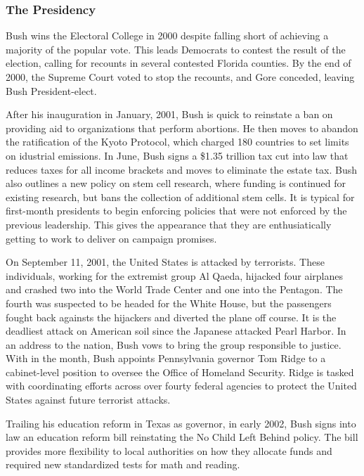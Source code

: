 \documentclass{article}
\begin{document}
        \subsubsection{The Presidency}
        Bush wins the Electoral College in 2000 despite falling short of achieving a majority of the popular vote. This leads Democrats to contest the result of the election, calling for recounts in several contested Florida counties. By the end of 2000, the Supreme Court voted to stop the recounts, and Gore conceded, leaving Bush President-elect.
        \par
        After his inauguration in January, 2001, Bush is quick to reinstate a ban on providing aid to organizations that perform abortions. He then moves to abandon the ratification of the Kyoto Protocol, which charged 180 countries to set limits on idustrial emissions. In June, Bush signs a \$1.35 trillion tax cut into law that reduces taxes for all income brackets and moves to eliminate the estate tax. Bush also outlines a new policy on stem cell research, where funding is continued for existing research, but bans the collection of additional stem cells.\cite{bushevents} It is typical for first-month presidents to begin enforcing policies that were not enforced by the previous leadership. This gives the appearance that they are enthusiatically getting to work to deliver on campaign promises.
        \par
        On September 11, 2001, the United States is attacked by terrorists. These individuals, working for the extremist group Al Qaeda, hijacked four airplanes and crashed two into the World Trade Center and one into the Pentagon. The fourth was suspected to be headed for the White House, but the passengers fought back againsts the hijackers and diverted the plane off course. It is the deadliest attack on American soil since the Japanese attacked Pearl Harbor. In an address to the nation, Bush vows to bring the group responsible to justice. With in the month, Bush appoints Pennsylvania governor Tom Ridge to a cabinet-level position to oversee the Office of Homeland Security. Ridge is tasked with coordinating efforts across over fourty federal agencies to protect the United States against future terrorist attacks.\cite{bushevents}
        \par
        Trailing his education reform in Texas as governor, in early 2002, Bush signs into law an education reform bill reinstating the No Child Left Behind policy. The bill provides more flexibility to local authorities on how they allocate funds and required new standardized tests for math and reading.\cite{bushevents}
\end{document}
